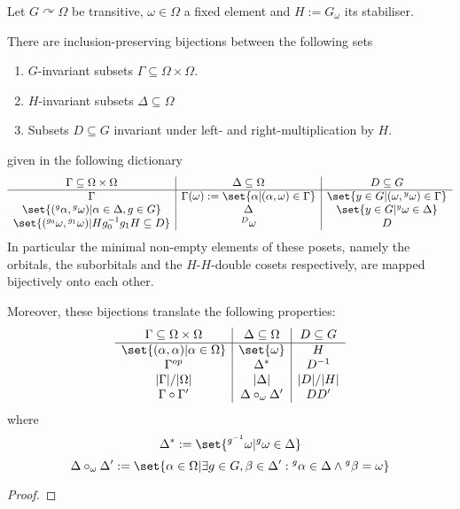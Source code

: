 \documentclass[fontsize=11pt,fleqn,a4paper]{scrartcl}
\begin{document}
\begin{theorem}
Let $G \curvearrowright \Omega$ be transitive, $\omega\in\Omega$ a fixed element and $H:=G_\omega$ its stabiliser.

There are inclusion-preserving bijections between the following sets
\begin{enumerate}
\item $G$-invariant subsets $\Gamma\subseteq\Omega\times\Omega$.
\item $H$-invariant subsets $\Delta\subseteq\Omega$
\item Subsets $D\subseteq G$ invariant under left- and right-multiplication by $H$.
\end{enumerate}
given in the following dictionary
\[\begin{array}{c|c|c}
\Gamma\subseteq\Omega\times\Omega & \Delta\subseteq\Omega & D\subseteq G \\
\hline
\Gamma & \Gamma(\omega) := \set{\alpha | (\alpha,\omega)\in\Gamma} & \set{ y\in G | (\omega,{^y \omega})\in\Gamma} \\
\set{({^g \alpha},{^g \omega}) | \alpha\in\Delta,g\in G} & \Delta & \set{y\in G | {^y \omega}\in\Delta} \\
\set{({^{g_0}\omega}, {^{g_1}\omega}) | Hg_0^{-1} g_1 H \subseteq D} & {^D\omega} & D \\
\end{array}\]
In particular the minimal non-empty elements of these posets, namely the orbitals, the suborbitals and the $H$-$H$-double cosets respectively, are mapped bijectively onto each other.

Moreover, these bijections translate the following properties:
\[\begin{array}{c|c|c}
\Gamma\subseteq\Omega\times\Omega & \Delta\subseteq\Omega & D\subseteq G \\
\hline
\set{(\alpha,\alpha) | \alpha\in\Omega} & \set{\omega} & H \\
\Gamma^{op} & \Delta^\ast & D^{-1} \\
\abs{\Gamma}/\abs{\Omega} & \abs{\Delta} & \abs{D}/\abs{H} \\
\Gamma \circ \Gamma' & \Delta \circ_\omega \Delta' & DD'
\end{array}\]
where
\[\Delta^\ast :=\set{{^{g^{-1}}\omega} | {^g \omega}\in\Delta}\]
\[\Delta \circ_\omega \Delta' := \set{\alpha\in\Omega | \exists g\in G, \beta\in\Delta': {^g \alpha}\in\Delta \wedge {^g\beta}=\omega}\]
\end{theorem}
\begin{proof}
\end{proof}
\end{document}
